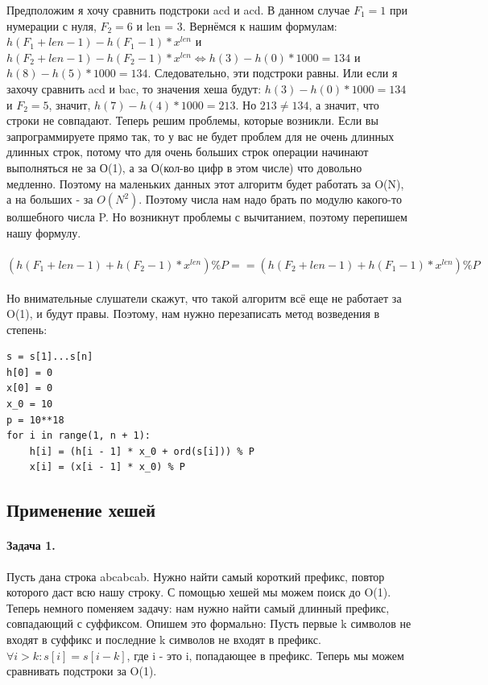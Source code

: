 \documentclass[12pt]{article}
\begin{document}
Предположим я хочу сравнить подстроки acd и acd. В данном случае $F_1 = 1$ при нумерации с нуля, $F_2 = 6$ и len = 3. Вернёмся к нашим формулам: $h(F_{1} + len - 1) - h(F_{1} - 1) * x^{len}$ и $h(F_{2} + len - 1) - h(F_{2} - 1) * x^{len} \Longleftrightarrow h(3) - h(0) * 1000 = 134$ и $h(8) - h(5) * 1000 = 134$. Следовательно, эти подстроки равны. Или если я захочу сравнить acd и bac, то значения хеша будут: $h(3) - h(0) * 1000 = 134$ и $F_2 = 5$, значит, $h(7) - h(4) * 1000 = 213$. Но $213 \neq 134$, а значит, что строки не совпадают. Теперь решим проблемы, которые возникли. Если вы запрограммируете прямо так, то у вас не будет проблем для не очень длинных длинных строк, потому что для очень больших строк операции начинают выполняться не за О(1), а за О(кол-во цифр в этом числе) что довольно медленно. Поэтому на маленьких данных этот алгоритм будет работать за O(N), а на больших - за $O(N^2)$. Поэтому числа нам надо брать по модулю какого-то волшебного числа P. Но возникнут проблемы с вычитанием, поэтому перепишем нашу формулу. \\ \\
$(h(F_{1} + len - 1) + h(F_{2} - 1) * x^{len}) \% P == (h(F_{2} + len - 1) + h(F_{1} - 1) * x^{len}) \% P$\\ \\
Но внимательные слушатели скажут, что такой алгоритм всё еще не работает за O(1), и будут правы. Поэтому, нам нужно перезаписать метод возведения в степень:
\begin{verbatim}
s = s[1]...s[n]
h[0] = 0
x[0] = 0
x_0 = 10
p = 10**18
for i in range(1, n + 1):
    h[i] = (h[i - 1] * x_0 + ord(s[i])) % P
    x[i] = (x[i - 1] * x_0) % P
\end{verbatim}
\subsection*{Применение хешей}
\paragraph{Задача 1.} Пусть дана строка abcabcab. Нужно найти самый короткий префикс, повтор которого даст всю нашу строку. С помощью хешей мы можем поиск до O(1). Теперь немного поменяем задачу: нам нужно найти самый длинный префикс, совпадающий с суффиксом. Опишем это формально: Пусть первые k символов не входят в суффикс и последние k символов не входят в префикс. \\
$\forall i > k: s[i] = s[i - k]$, где i - это i, попадающее в префикс. Теперь мы можем сравнивать подстроки за O(1). 
\end{document}
